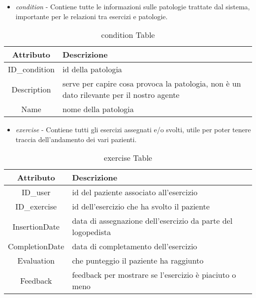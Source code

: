 \documentclass{article}
\begin{document}
\begin{itemize}
\item     \textit{condition} - Contiene tutte le informazioni sulle patologie trattate dal sistema, importante per le relazioni tra esercizi e patologie.
\end{itemize}

    \begin{table}[h]
        \centering
        \caption{condition Table}
        \begin{tabular}{|c|p{8cm}|}
            \hline
                \textbf{Attributo} & \textbf{Descrizione} \\
            \hline
                ID\_condition & id della patologia\\
            \hline
                Description & serve per capire cosa provoca la patologia, non è un dato rilevante per il nostro agente\\
            \hline
                Name & nome della patologia\\
            \hline
        \end{tabular}
    \end{table}

\begin{itemize}
\item    \textit{exercise} - Contiene tutti gli esercizi assegnati e/o svolti, utile per poter tenere traccia dell'andamento dei vari pazienti.
\end{itemize}

    \begin{table}[h]
        \centering
        \caption{exercise Table}
        \begin{tabular}{|c|p{8cm}|}
            \hline
                \textbf{Attributo} & \textbf{Descrizione} \\
            \hline
                ID\_user & id del paziente associato all'esercizio\\
            \hline
                ID\_exercise & id dell'esercizio che ha svolto il paziente\\
            \hline
                InsertionDate & data di assegnazione dell'esercizio da parte del logopedista\\
            \hline
                CompletionDate & data di completamento dell'esercizio\\
            \hline
                Evaluation & che punteggio il paziente ha raggiunto\\
            \hline
                Feedback & feedback per mostrare se l'esercizio è piaciuto o meno\\
            \hline
        \end{tabular}
    \end{table}
\end{document}
